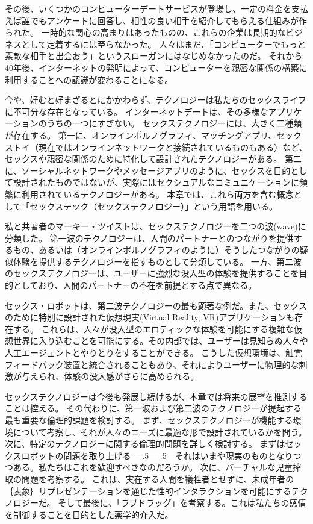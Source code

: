 \documentclass[paper=a4,book,openany]{jlreq}
\def\DDASH{―\kern-.5\zw―\kern-.5\zw―} %
\begin{document}
その後、いくつかのコンピューターデートサービスが登場し、一定の料金を支払えば誰でもアンケートに回答し、相性の良い相手を紹介してもらえる仕組みが作られた。
一時的な関心の高まりはあったものの、これらの企業は長期的なビジネスとして定着するには至らなかった。
人々はまだ、「コンピューターでもっと素敵な相手と出会おう」というスローガンにはなじめなかったのだ。
それから40年後、インターネットの発明によって、コンピューターを親密な関係の構築に利用することへの認識が変わることになる。

今や、好むと好まざるとにかかわらず、テクノロジーは私たちのセックスライフに不可分な存在となっている。
インターネットデートは、その多様なアプリケーションのうちの一つにすぎない。
セックステクノロジーには、大きく二種類が存在する。
第一に、オンラインポルノグラフィ、マッチングアプリ、セックストイ（現在ではオンラインネットワークと接続されているものもある）など、セックスや親密な関係のために特化して設計されたテクノロジーがある。
第二に、ソーシャルネットワークやメッセージアプリのように、セックスを目的として設計されたものではないが、実際にはセクシュアルなコミュニケーションに頻繁に利用されているテクノロジーがある。
本章では、これら両方を含む概念として「セックステック（セックステクノロジー）」という用語を用いる。

私と共著者のマーキー・ツイストは、セックステクノロジーを二つの波(wave)に分類した\citep{mcarthur17:_rise_digis}。
第一波のテクノロジーは、人間のパートナーとのつながりを提供するもの、あるいは（オンラインポルノグラフィのように）そうしたつながりの疑似体験を提供するテクノロジーを指すものとして分類している。
一方、第二波のセックステクノロジーは、ユーザーに強烈な没入型の体験を提供することを目的としており、人間のパートナーの不在を前提とする点で異なる。

セックス・ロボットは、第二波テクノロジーの最も顕著な例だ。また、セックスのために特別に設計された仮想現実(Virtual Reality, VR)アプリケーションも存在する。
これらは、人々が没入型のエロティックな体験を可能にする複雑な仮想世界に入り込むことを可能にする。その内部では、ユーザーは見知らぬ人々や人工エージェントとやりとりをすることができる。
こうした仮想環境は、触覚フィードバック装置と統合されることもあり、それによりユーザーに物理的な刺激が与えられ、体験の没入感がさらに高められる。

セックステクノロジーは今後も発展し続けるが、本章では将来の展望を推測することは控える。
その代わりに、第一波および第二波のテクノロジーが提起する最も重要な倫理的課題を検討する。
まず、セックステクノロジーが機能する環境について考察し、それが人々のニーズに最適な形で設計されているかを問う。
次に、特定のテクノロジーに関する倫理的問題を詳しく検討する。
まずはセックスロボットの問題を取り上げる{\DDASH}それはいまや現実のものとなりつつある。私たちはこれを歓迎すべきなのだろうか。
次に、バーチャルな児童搾取の問題を考察する。
これは、実在する人間を犠牲者とせずに、未成年者の｛表象｝{リプレゼンテーション}を通じた性的インタラクションを可能にするテクノロジーだ。
そして最後に、「ラブドラッグ」を考察する。これは私たちの感情を制御することを目的とした薬学的介入だ。
\end{document}
